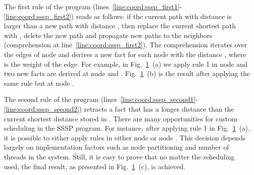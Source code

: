 \begin{figure}
\begin{center}
\begin{subfigure}[b]{0.49\textwidth}
      \mycap{}
   \end{subfigure}
\end{center}


\label{fig:shortest_path_program}
\end{figure}

The first rule of the program
(lines~\ref{line:coord:sssp_first1}-\ref{line:coord:sssp_first2}) reads as
follows: if the current  path  with distance 
is larger than a new path  with distance , then replace the
current shortest path with , delete the new  path and
propagate new paths to the neighbors (comprehension at
line~\ref{line:coord:sssp_first2}). The comprehension iterates over the edges of
node  and derives a new  fact for each node  with
the distance , where  is the weight of the edge. For
example, in Fig.~\ref{fig:shortest_path_program}~(a) we apply rule 1 in node
 and two new  facts are derived at node  and
.  Fig.~\ref{fig:shortest_path_program}~(b) is the result after
applying the same rule but at node .

The second rule of the program
(lines~\ref{line:coord:sssp_second1}-\ref{line:coord:sssp_second2}) retracts a
 fact that has a longer distance than the current shortest distance
stored in . There are many opportunities for custom scheduling
in the SSSP program. For instance, after applying rule 1 in
Fig.~\ref{fig:shortest_path_program}~(a), it is possible to either apply rules
in either node  or node .  This decision depends largely on
implementation factors such as node partitioning and number of threads in the
system. Still, it is easy to prove that no matter the scheduling used, the final
result, as presented in Fig.~\ref{fig:shortest_path_program}~(c), is achieved.

